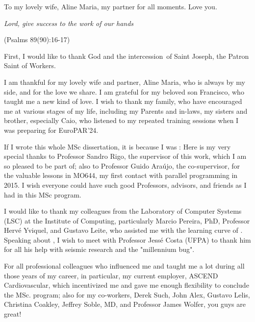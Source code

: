 \documentclass[Ingles,Final]{ic-tese-v3}
\begin{document}
\paginasiniciais


To my lovely wife, Aline Maria, my partner for all moments. Love you.


\begin{epigrafe}
{\it
Lord, give success to the work of our hands
}

\hfill (Psalms 89(90):16-17)
\end{epigrafe}


First, I would like to thank God and the intercession of Saint Joseph, the Patron Saint of Workers. 

I am thankful for my lovely wife and partner, Aline Maria, who is always by my side, and for the love we share. I am grateful for my beloved son Francisco, who taught me a new kind of love. I wish to thank my family, who have encouraged me at various stages of my life, including my Parents and in-laws, my sisters and brother, especially Caio, who listened to my repeated training sessions when I was preparing for EuroPAR'24.

If I wrote this whole MSc dissertation, it is because I was : Here is my very special thanks to Professor Sandro Rigo, the supervisor of this work, which I am so pleased to be part of; also to Professor Guido Araújo, the co-supervisor, for the valuable lessons in MO644, my first contact with parallel programming in 2015. I wish everyone could have such good Professors, advisors, and friends as I had in this MSc program.

I would like to thank my colleagues from the Laboratory of Computer Systems (LSC) at the Institute of Computing, particularly Marcio Pereira, PhD, Professor Hervé Yviquel, and Gustavo Leite, who assisted me with the learning curve of \awave. Speaking about \awave, I wish to meet with Professor Jessé Costa (UFPA) to thank him for all his help with seismic research and the "millennium bug".

For all professional colleagues who influenced me and taught me a lot during all those years of my career, in particular, my current employer, ASCEND Cardiovascular, which incentivized me and gave me enough flexibility to conclude the MSc. program; also for my co-workers, Derek Such, John Alex, Gustavo Lelis, Christina Coakley, Jeffrey Soble, MD, and Professor James Wolfer, you guys are great!
\end{document}
